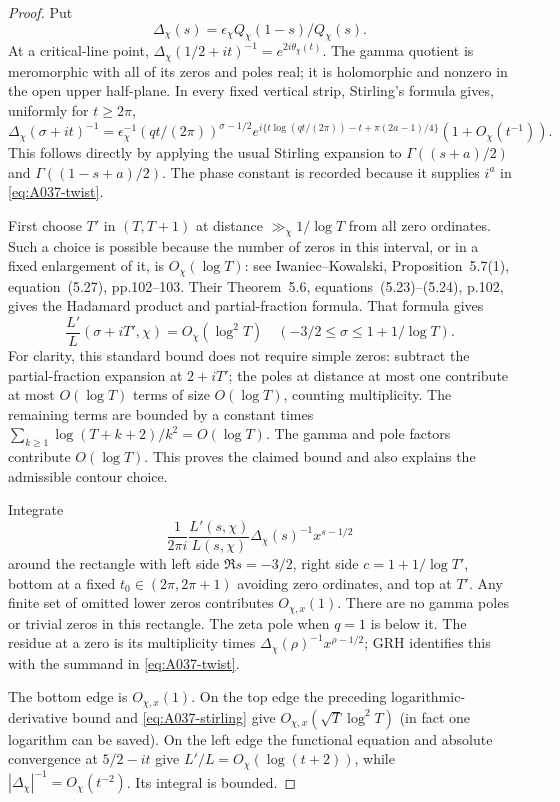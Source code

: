\begin{proof}
Put
\[
 \Delta_\chi(s)=\epsilon_\chi Q_\chi(1-s)/Q_\chi(s).
\]
At a critical-line point,
$\Delta_\chi(1/2+it)^{-1}=e^{2i\theta_\chi(t)}$.
The gamma quotient is meromorphic with all of its zeros and poles real;
it is holomorphic and nonzero in the open upper half-plane. In every
fixed vertical strip, Stirling's formula gives, uniformly for $t\ge2\pi$,
\begin{equation}\label{eq:A037-stirling}
 \Delta_\chi(\sigma+it)^{-1}
 =\epsilon_\chi^{-1}(qt/(2\pi))^{\sigma-1/2}
 e^{i\{t\log(qt/(2\pi))-t+\pi(2a-1)/4\}}
 (1+O_\chi(t^{-1})).
\end{equation}
This follows directly by applying the usual Stirling expansion to
$\Gamma((s+a)/2)$ and $\Gamma((1-s+a)/2)$. The phase constant is
recorded because it supplies $i^a$ in \eqref{eq:A037-twist}.

First choose $T'$ in $(T,T+1)$ at distance $\gg_\chi1/\log T$ from
all zero ordinates. Such a choice is possible because the number of
zeros in this interval, or in a fixed enlargement of it, is
$O_\chi(\log T)$: see Iwaniec--Kowalski, Proposition~5.7(1),
equation~(5.27), pp.102--103. Their Theorem~5.6,
equations~(5.23)--(5.24), p.102, gives the Hadamard product and
partial-fraction formula. That formula gives
\[
 \frac{L'}L(\sigma+iT',\chi)=O_\chi(\log^2 T)
 \quad(-3/2\le\sigma\le 1+1/\log T).
\]
For clarity, this standard bound does not require simple zeros:
subtract the partial-fraction expansion at $2+iT'$; the poles at
distance at most one contribute at most $O(\log T)$ terms of size
$O(\log T)$, counting multiplicity. The remaining terms are bounded
by a constant times $\sum_{k\ge1}\log(T+k+2)/k^2=O(\log T)$.
The gamma and pole factors contribute $O(\log T)$. This proves the
claimed bound and also explains the admissible contour choice.

Integrate
\[
 \frac1{2\pi i}\frac{L'(s,\chi)}{L(s,\chi)}
          \Delta_\chi(s)^{-1}x^{s-1/2}
\]
around the rectangle with left side $\Re s=-3/2$, right side
$c=1+1/\log T'$, bottom at a fixed
$t_0\in(2\pi,2\pi+1)$ avoiding zero ordinates, and top at $T'$.
Any finite set of omitted lower zeros contributes $O_{\chi,x}(1)$.
There are no gamma poles or trivial zeros in this rectangle. The zeta
pole when $q=1$ is below it. The residue at a zero is its multiplicity
times $\Delta_\chi(\rho)^{-1}x^{\rho-1/2}$; GRH identifies this with
the summand in \eqref{eq:A037-twist}.

The bottom edge is $O_{\chi,x}(1)$. On the top edge the preceding
logarithmic-derivative bound and \eqref{eq:A037-stirling} give
$O_{\chi,x}(\sqrt T\log^2T)$ (in fact one logarithm can be saved).
On the left edge the functional equation and absolute convergence at
$5/2-it$ give $L'/L=O_\chi(\log(t+2))$, while
$|\Delta_\chi|^{-1}=O_\chi(t^{-2})$. Its integral is bounded.


\end{proof}
